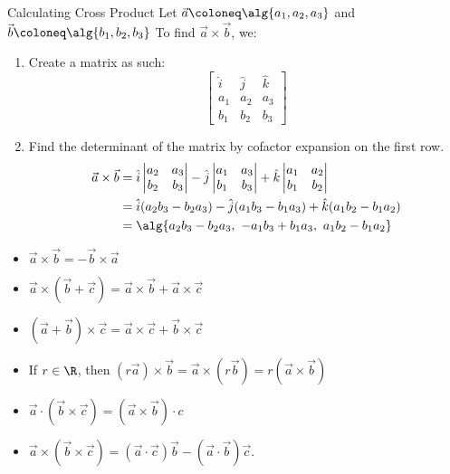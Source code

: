 \documentclass[12pt]{report}
\begin{document}
\begin{tecbox}{Calculating Cross Product}{}
Let $\vec{a} \coloneq \alg{a_1, a_2, a_3}$ and $\vec{b} \coloneq \alg{b_1, b_2, b_3}$ To find $\vec{a} \times \vec{b}$, we:
\begin{enumerate}
    \item Create a matrix as such:
    \[ \begin{bmatrix}
        \hat{i} & \hat{j} & \hat{k} \\
        a_1 & a_2 & a_3 \\
        b_1 & b_2 & b_3
    \end{bmatrix} \]
    \item Find the determinant of the matrix by cofactor expansion on the first row.
    \begin{align*}
        \vec{a} \times \vec{b} &= \hat{i} \begin{vmatrix} a_2 & a_3 \\ b_2 & b_3 \end{vmatrix} - \hat{j} \begin{vmatrix} a_1 & a_3 \\ b_1 & b_3 \end{vmatrix} + \hat{k} \begin{vmatrix} a_1 & a_2 \\ b_1 & b_2 \end{vmatrix} \\
        &= \hat{i}(a_2b_3 - b_2a_3) - \hat{j}(a_1b_3 - b_1a_3) + \hat{k}(a_1b_2 - b_1a_2) \\
        &= \alg{ a_2b_3 - b_2a_3 ,\  -a_1b_3 + b_1a_3 ,\  a_1b_2 - b_1a_2 }
    \end{align*}
\end{enumerate}
\end{tecbox}

\begin{itemize}
    \item $\vec{a} \times \vec{b} = -\vec{b} \times \vec{a}$
    \item $\vec{a} \times (\vec{b} + \vec{c}) = \vec{a} \times \vec{b} + \vec{a} \times \vec{c}$
    \item $(\vec{a} + \vec{b}) \times \vec{c} = \vec{a} \times \vec{c} + \vec{b} \times \vec{c}$
    \item If $r \in \R$, then $(r\vec{a}) \times \vec{b} = \vec{a} \times (r\vec{b}) = r(\vec{a} \times \vec{b})$
    \item $\vec{a} \cdot (\vec{b} \times \vec{c}) = (\vec{a} \times \vec{b}) \cdot c$
    \item $\vec{a} \times (\vec{b} \times \vec{c}) = (\vec{a} \cdot \vec{c}) \vec{b} - (\vec{a} \cdot \vec{b}) \vec{c}$.
\end{itemize}
\end{document}

